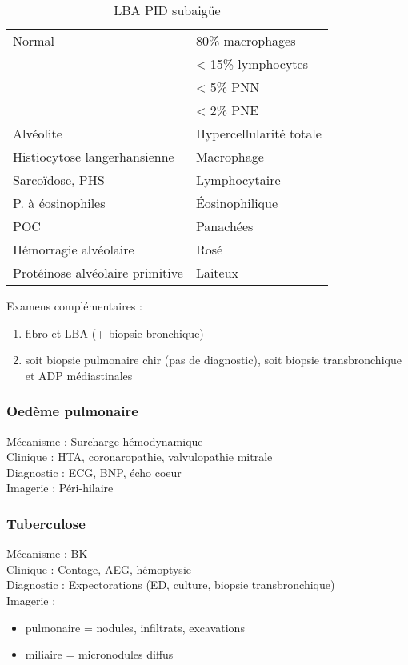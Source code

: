 \begin{table}[htbp]
  \caption{LBA PID subaigüe}
  \centering
  \begin{tabular}{ll}
    \toprule
    Normal & 80\% macrophages\\
           & < 15\% lymphocytes\\
           & < 5\% PNN\\
           & < 2\% PNE\\
    \midrule
    Alvéolite & Hypercellularité totale\\
    Histiocytose langerhansienne & Macrophage\\
    Sarcoïdose, PHS & Lymphocytaire\\
    P. à éosinophiles & Éosinophilique\\
    \gls{POC} & Panachées\\
    Hémorragie alvéolaire & Rosé\\
    Protéinose alvéolaire primitive & Laiteux\\
    \bottomrule
  \end{tabular}
\end{table}

Examens complémentaires :
\begin{enumerate}
\item fibro et LBA (+ biopsie bronchique)
\item soit biopsie pulmonaire chir (pas de diagnostic), soit biopsie
  transbronchique et ADP médiastinales
\end{enumerate}

\subsubsection{Oedème pulmonaire}
Mécanisme : Surcharge hémodynamique\\
Clinique : HTA, coronaropathie, valvulopathie mitrale\\
Diagnostic : ECG, BNP, écho coeur\\
Imagerie : Péri-hilaire

\subsubsection{Tuberculose}
Mécanisme : BK\\
Clinique : Contage, AEG, hémoptysie\\
Diagnostic : Expectorations (ED, culture, biopsie transbronchique)\\
Imagerie : 
\begin{itemize}
\item pulmonaire = nodules, infiltrats, excavations
\item miliaire = micronodules diffus
\end{itemize}

